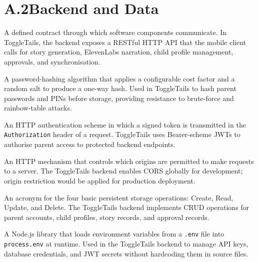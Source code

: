 \section*{A.2\quad Backend and Data}

\begin{description}[leftmargin=2.5cm, style=nextline]

\item[\textbf{API (Application Programming Interface)}]
A defined contract through which software components communicate. In
ToggleTails, the backend exposes a RESTful HTTP API that the mobile client
calls for story generation, ElevenLabs narration, child profile management,
approvals, and synchronisation.

\item[\textbf{bcrypt / bcryptjs}]
A password-hashing algorithm that applies a configurable cost factor and a
random salt to produce a one-way hash. Used in ToggleTails to hash parent
passwords and PINs before storage, providing resistance to brute-force and
rainbow-table attacks.

\item[\textbf{Bearer Token}]
An HTTP authentication scheme in which a signed token is transmitted in the
\texttt{Authorization} header of a request. ToggleTails uses Bearer-scheme
JWTs to authorise parent access to protected backend endpoints.

\item[\textbf{CORS (Cross-Origin Resource Sharing)}]
An HTTP mechanism that controls which origins are permitted to make requests
to a server. The ToggleTails backend enables CORS globally for development;
origin restriction would be applied for production deployment.

\item[\textbf{CRUD}]
An acronym for the four basic persistent storage operations: Create, Read,
Update, and Delete. The ToggleTails backend implements CRUD operations for
parent accounts, child profiles, story records, and approval records.

\item[\textbf{dotenv}]
A Node.js library that loads environment variables from a \texttt{.env} file
into \texttt{process.env} at runtime. Used in the ToggleTails backend to
manage API keys, database credentials, and JWT secrets without hardcoding
them in source files.


\end{description}
